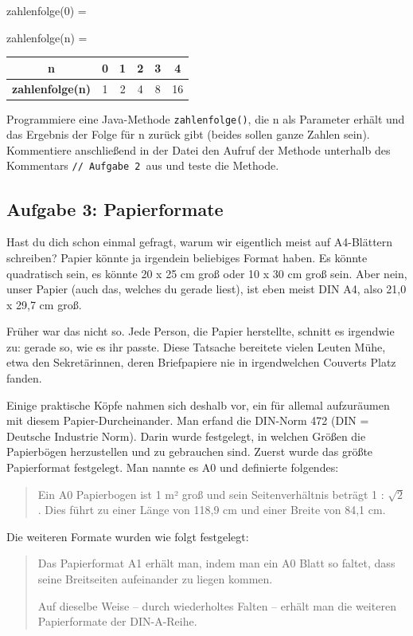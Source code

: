 zahlenfolge(0) = 

zahlenfolge(n) =

\begin{tabular}{|c|c|c|c|c|c|}\hline
\textbf{n}              & 0 & 1 & 2 & 3 &  4 \\ \hline
\textbf{zahlenfolge(n)} & 1 & 2 & 4 & 8 & 16 \\ \hline
\end{tabular}

Programmiere eine Java-Methode \lstinline|zahlenfolge()|, die n als Parameter
erhält und das Ergebnis der Folge für n zurück gibt (beides sollen ganze Zahlen sein). 
Kommentiere anschließend in der Datei den Aufruf der Methode unterhalb des
Kommentars \glqq\lstinline|// Aufgabe 2|\grqq\ aus und teste die Methode.


\subsection{Aufgabe 3: Papierformate}

Hast du dich schon einmal gefragt, warum wir eigentlich meist auf A4-Blättern
schreiben? Papier könnte ja irgendein beliebiges Format haben. Es könnte
quadratisch sein, es könnte 20 x 25 cm groß oder 10 x 30 cm groß sein. Aber
nein, unser Papier (auch das, welches du gerade liest), ist eben meist DIN A4,
also 21,0 x 29,7 cm groß.

Früher war das nicht so. Jede Person, die Papier herstellte, schnitt es
irgendwie zu: gerade so, wie es ihr passte. Diese Tatsache bereitete vielen
Leuten Mühe, etwa den Sekretärinnen, deren Briefpapiere nie in irgendwelchen
Couverts Platz fanden.

Einige praktische Köpfe nahmen sich deshalb vor, ein für allemal aufzuräumen
mit diesem Papier-Durcheinander. Man erfand die DIN-Norm 472 (DIN = Deutsche
Industrie Norm). Darin wurde festgelegt, in welchen Größen die Papierbögen
herzustellen und zu gebrauchen sind. Zuerst wurde das größte Papierformat
festgelegt. Man nannte es A0 und definierte folgendes:

\begin{quotation}
\noindent Ein A0 Papierbogen ist 1 m² groß und sein Seitenverhältnis beträgt 1 :
$\sqrt{2}$. Dies führt zu einer Länge von 118,9 cm und einer Breite von 84,1
cm.
\end{quotation}

Die weiteren Formate wurden wie folgt festgelegt:

\begin{quotation}
\noindent Das Papierformat A1 erhält man, indem man ein A0 Blatt so faltet,
 dass seine Breitseiten aufeinander zu liegen kommen.

\vspace{3mm}

\noindent Auf dieselbe Weise -- durch wiederholtes Falten -- erhält man die
weiteren Papierformate der DIN-A-Reihe.
\end{quotation}

